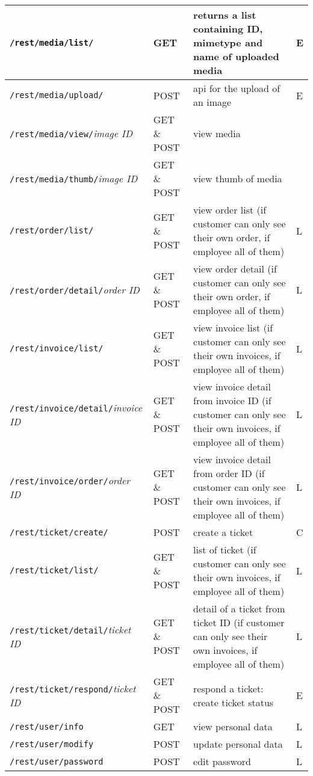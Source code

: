 \begin{longtable}{|p{}|p{} |p{}|p{}|}
\texttt{/rest/media/list/} & GET & returns a list containing ID, mimetype and name of uploaded media & E\\\hline
\texttt{/rest/media/upload/} & POST &  api for the upload of an image & E\\\hline
\texttt{/rest/media/view/}\textit{image ID} & GET \& POST &  view media &  \\\hline
\texttt{/rest/media/thumb/}\textit{image ID} & GET \& POST & view thumb of media &  \\\hline
\texttt{/rest/order/list/} & GET \& POST & view order list (if customer can only see their own order, if employee all of them) & L\\\hline
\texttt{/rest/order/detail/}\textit{order ID} & GET \& POST & view order detail (if customer can only see their own order, if employee all of them) & L\\\hline
\texttt{/rest/invoice/list/} & GET \& POST & view invoice list (if customer can only see their own invoices, if employee all of them) & L\\\hline
\texttt{/rest/invoice/detail/}\textit{invoice ID} & GET \& POST & view invoice detail from invoice ID (if customer can only see their own invoices, if employee all of them) & L\\\hline
\texttt{/rest/invoice/order/}\textit{order ID} & GET \& POST & view invoice detail from order ID (if customer can only see their own invoices, if employee all of them) & L\\\hline
\texttt{/rest/ticket/create/} & POST  & create a ticket & C \\\hline
\texttt{/rest/ticket/list/} & GET \& POST  & list of ticket (if customer can only see their own invoices, if employee all of them) & L \\\hline
\texttt{/rest/ticket/detail/}\textit{ticket ID} & GET \& POST & detail of a ticket from ticket ID (if customer can only see their own invoices, if employee all of them) & L \\\hline
\texttt{/rest/ticket/respond/}\textit{ticket ID} & GET \& POST & respond a ticket: create ticket status & E \\\hline
\texttt{/rest/user/info} & GET & view personal data & L \\\hline
\texttt{/rest/user/modify} & POST & update personal data & L\\\hline
\texttt{/rest/user/password} & POST & edit password & L\\\hline



\end{longtable}
